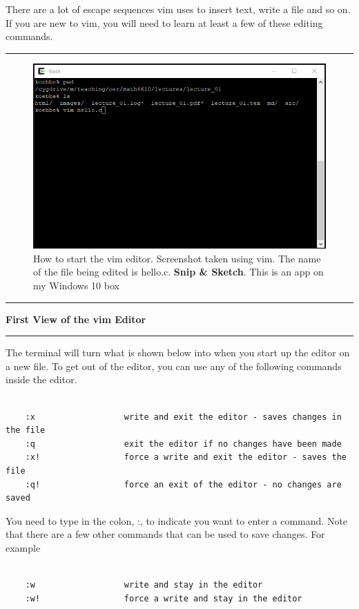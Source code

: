 \documentclass[10pt,fleqn]{article}
\begin{document}
There are a lot of escape sequences vim uses to insert text, write a file and
so on. If you are new to vim, you will need to learn at least a few of these
editing commands.
\vskip0.1in\hrule\vskip0.1in
\vfill
\begin{figure}[h]
\centering
\includegraphics{../images/cygwin_05.png}
\caption{How to start the vim editor. Screenshot taken using vim. The name of 
         the file being edited is hello.c. {\bf Snip \& Sketch}. This is an app
         on my Windows 10 box}
\end{figure}
\eject
\vskip0.1in\hrule\vskip0.1in
\noindent
{\large{\bf First View of the vim Editor}} 
\vskip0.1in\hrule\vskip0.1in
\noindent
The terminal will turn what is shown below into when you start up the editor on
a new file. To get out of the editor, you can use any of the following commands
inside the editor.
\begin{verbatim}

    :x                  write and exit the editor - saves changes in the file
    :q                  exit the editor if no changes have been made
    :x!                 force a write and exit the editor - saves the file
    :q!                 force an exit of the editor - no changes are saved

\end{verbatim}
You need to type in the colon, :, to indicate you want to enter a command. Note
that there are a few other commands that can be used to save changes. For
example
\begin{verbatim}

    :w                  write and stay in the editor
    :w!                 force a write and stay in the editor

\end{verbatim}
\end{document}
